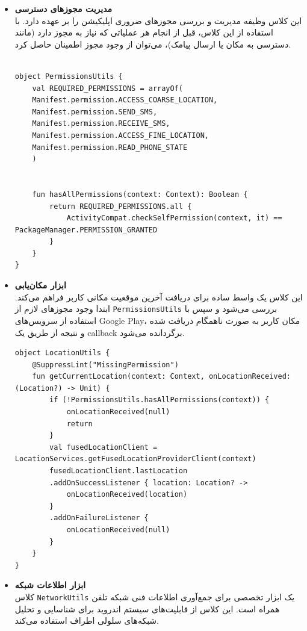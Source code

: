 \documentclass{report}
\begin{document}
\begin{itemize}
	\item \textbf{مدیریت مجوزهای دسترسی}\\
	این کلاس وظیفه مدیریت و بررسی مجوزهای ضروری اپلیکیشن را بر عهده دارد. با استفاده از این کلاس، قبل از انجام هر عملیاتی که نیاز به مجوز دارد (مانند دسترسی به مکان یا ارسال پیامک)، می‌توان از وجود مجوز اطمینان حاصل کرد.
	
	\begin{lstlisting}[caption=PermissionsUtils.kt]

object PermissionsUtils {
	val REQUIRED_PERMISSIONS = arrayOf(
	Manifest.permission.ACCESS_COARSE_LOCATION,
	Manifest.permission.SEND_SMS,
	Manifest.permission.RECEIVE_SMS,
	Manifest.permission.ACCESS_FINE_LOCATION,
	Manifest.permission.READ_PHONE_STATE
	)
	
	
	fun hasAllPermissions(context: Context): Boolean {
		return REQUIRED_PERMISSIONS.all {
			ActivityCompat.checkSelfPermission(context, it) == PackageManager.PERMISSION_GRANTED
		}
	}
}
	\end{lstlisting}
	
	\item \textbf{ابزار مکان‌یابی}\\
	این کلاس یک واسط ساده برای دریافت آخرین موقعیت مکانی کاربر فراهم می‌کند. ابتدا وجود مجوزهای لازم از \texttt{PermissionsUtils} بررسی می‌شود و سپس با استفاده از سرویس‌های Google Play، مکان کاربر به صورت ناهمگام دریافت شده و نتیجه از طریق یک callback برگردانده می‌شود.
	
	\begin{lstlisting}[caption=LocationUtils.kt]
object LocationUtils {
	@SuppressLint("MissingPermission")
	fun getCurrentLocation(context: Context, onLocationReceived: (Location?) -> Unit) {
		if (!PermissionsUtils.hasAllPermissions(context)) {
			onLocationReceived(null)
			return
		}
		val fusedLocationClient = LocationServices.getFusedLocationProviderClient(context)
		fusedLocationClient.lastLocation
		.addOnSuccessListener { location: Location? ->
			onLocationReceived(location)
		}
		.addOnFailureListener {
			onLocationReceived(null)
		}
	}
}
	\end{lstlisting}
	
	\item \textbf{ابزار اطلاعات شبکه}\\
	کلاس \texttt{NetworkUtils} یک ابزار تخصصی برای جمع‌آوری اطلاعات فنی شبکه تلفن همراه است. این کلاس از قابلیت‌های سیستم اندروید برای شناسایی و تحلیل شبکه‌های سلولی اطراف استفاده می‌کند.
	

\end{itemize}
\end{document}
